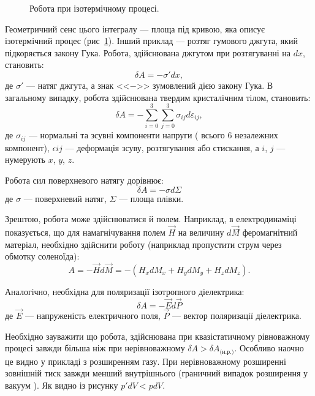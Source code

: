 \begin{figure}
\begin{center}

\end{center}
\caption{Робота при ізотермічному процесі.}\label{pic:isothermic}
\end{figure}

Геометричний сенс цього інтегралу --- площа під кривою, яка описує ізотермічний процес (рис~\ref{pic:isothermic}). Інший приклад --- розтяг гумового джгута, який підкоряється закону Гука. Робота, здійснювана джгутом при розтягуванні на $dx$, становить:
\begin{equation*}
    \delta A = -\sigma' dx,
\end{equation*}
де $\sigma'$ --- натяг джгута, а знак <<$-$>> зумовлений дією закону Гука. В загальному випадку, робота здійснювана твердим кристалічним тілом, становить:
\begin{equation*}
    \delta A = -\sum\limits_{i = 0}^{3}\sum\limits_{j = 0}^{3}\sigma_{ij}d\varepsilon_{ij},
\end{equation*}
де $\sigma_{ij}$ --- нормальні та зсувні компоненти напруги ( всього 6 незалежних компонент),   $\epsilon{ij}$ --- деформація зсуву, розтягування або стискання, а $i$, $j$ --- нумерують $x$, $y$, $z$.

Робота сил поверхневого натягу дорівнює:
\begin{equation*}
   \delta A = -\sigma d\Sigma
\end{equation*}
де $\sigma$ --- поверхневий натяг, $\Sigma$ --- площа плівки.

Зрештою, робота може здійснюватися й полем. Наприклад, в електродинаміці показується, що для намагнічування полем $\vec{H}$ на величину $d\vec{M}$⃗ феромагнітний матеріал, необхідно здійснити роботу (наприклад пропустити струм через обмотку соленоїда):
\begin{equation*}
    A=-\vec{H} d\vec{M} = - (H_x dM_x+H_y dM_y + H_z dM_z).
\end{equation*}

Аналогічно, необхідна для поляризації ізотропного діелектрика:
\begin{equation*}
    \delta A = - \vec{E} d\vec{P}
\end{equation*}
де $\vec{E}$ --- напруженість електричного поля, $\vec{P}$ --- вектор поляризації діелектрика.

Необхідно зауважити що робота, здійснювана при квазістатичному рівноважному процесі завжди більша ніж при нерівноважному $\delta A > \delta A_{\text{(н.р.)}}$. Особливо наочно це видно у прикладі з розширенням газу. При нерівноважному розширенні зовнішній тиск завжди менший внутрішнього (граничний випадок розширення у вакуум ). Як видно із рисунку $p' dV < p dV$.

